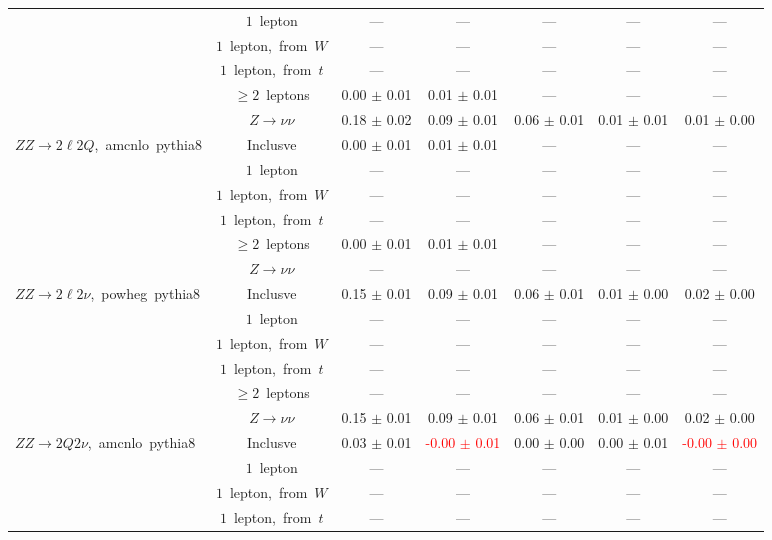\documentclass{article}
\begin{document}
\begin{longtable}{|l|c|c|c|c|c|c|}
 & $1$~lepton  & ---  & ---  & ---  & ---  & --- \\* 
 & $1$~lepton,~from~$W$  & ---  & ---  & ---  & ---  & --- \\* 
 & $1$~lepton,~from~$t$  & ---  & ---  & ---  & ---  & --- \\* 
 & $\ge2$~leptons  & 0.00 $\pm$ 0.01  & 0.01 $\pm$ 0.01  & ---  & ---  & --- \\* 
 & $Z\rightarrow\nu\nu$  & 0.18 $\pm$ 0.02  & 0.09 $\pm$ 0.01  & 0.06 $\pm$ 0.01  & 0.01 $\pm$ 0.01  & 0.01 $\pm$ 0.00 \\* 
\hline 
\multirow{6}{*}{$ZZ{\rightarrow}2{\ell}2Q$,~amcnlo~pythia8} & Inclusve  & 0.00 $\pm$ 0.01  & 0.01 $\pm$ 0.01  & ---  & ---  & --- \\* 
 & $1$~lepton  & ---  & ---  & ---  & ---  & --- \\* 
 & $1$~lepton,~from~$W$  & ---  & ---  & ---  & ---  & --- \\* 
 & $1$~lepton,~from~$t$  & ---  & ---  & ---  & ---  & --- \\* 
 & $\ge2$~leptons  & 0.00 $\pm$ 0.01  & 0.01 $\pm$ 0.01  & ---  & ---  & --- \\* 
 & $Z\rightarrow\nu\nu$  & ---  & ---  & ---  & ---  & --- \\* 
\hline 
\multirow{6}{*}{$ZZ{\rightarrow}2{\ell}2{\nu}$,~powheg~pythia8} & Inclusve  & 0.15 $\pm$ 0.01  & 0.09 $\pm$ 0.01  & 0.06 $\pm$ 0.01  & 0.01 $\pm$ 0.00  & 0.02 $\pm$ 0.00 \\* 
 & $1$~lepton  & ---  & ---  & ---  & ---  & --- \\* 
 & $1$~lepton,~from~$W$  & ---  & ---  & ---  & ---  & --- \\* 
 & $1$~lepton,~from~$t$  & ---  & ---  & ---  & ---  & --- \\* 
 & $\ge2$~leptons  & ---  & ---  & ---  & ---  & --- \\* 
 & $Z\rightarrow\nu\nu$  & 0.15 $\pm$ 0.01  & 0.09 $\pm$ 0.01  & 0.06 $\pm$ 0.01  & 0.01 $\pm$ 0.00  & 0.02 $\pm$ 0.00 \\* 
\hline 
\multirow{6}{*}{$ZZ{\rightarrow}2Q2{\nu}$,~amcnlo~pythia8} & Inclusve  & 0.03 $\pm$ 0.01  & \textcolor{red}{ -0.00 $\pm$ 0.01 }  & 0.00 $\pm$ 0.00  & 0.00 $\pm$ 0.01  & \textcolor{red}{ -0.00 $\pm$ 0.00 } \\* 
 & $1$~lepton  & ---  & ---  & ---  & ---  & --- \\* 
 & $1$~lepton,~from~$W$  & ---  & ---  & ---  & ---  & --- \\* 
 & $1$~lepton,~from~$t$  & ---  & ---  & ---  & ---  & --- \\* 

\end{longtable}
\end{document}
